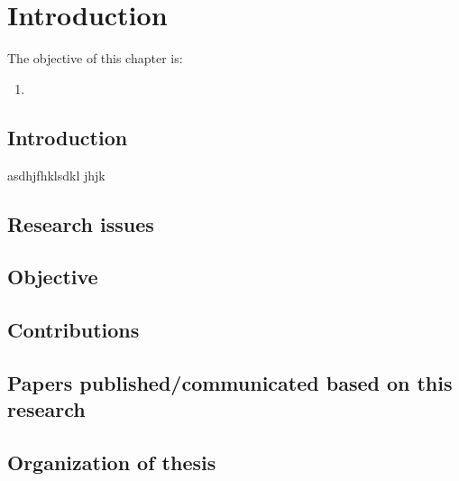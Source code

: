 
\chapter{Introduction} %

\label{Chapter1} %



The objective of this chapter is:

\begin{enumerate}
\item 
\end{enumerate}
 
\section{Introduction} 
asdhjfhklsdkl jhjk 




\section{Research issues }

\section{Objective}
\section{Contributions}

\section{Papers published/communicated based on this research}



\section{Organization of thesis}

	
	
